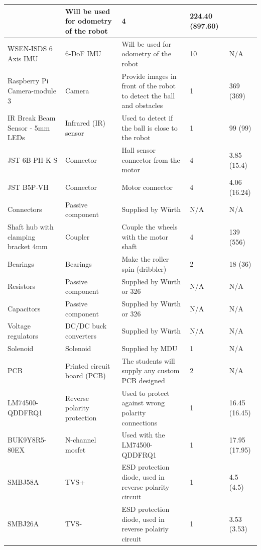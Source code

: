 \documentclass[a4paper,4pt]{article}
\begin{document}
\begin{center}
\begin{longtable}{|p{3cm}|p{3cm}|p{3cm}|p{1cm}|p{2cm}| }
      & Will be used for odometry of the robot & 4 & 224.40 (897.60) \\
      \hline WSEN-ISDS 6 Axis IMU & 6-DoF IMU & Will be used for
      odometry of the robot & 10 & N/A\\ \hline Raspberry Pi
      Camera-module 3 & Camera & Provide images in front of the robot to
      detect the ball and obstacles & 1 & 369 (369) \\ \hline IR Break
      Beam Sensor - 5mm LEDs & Infrared (IR) sensor & Used to detect if
      the ball is close to the robot & 1 & 99 (99) \\ \hline JST
      6B-PH-K-S & Connector & Hall sensor connector from the motor & 4 &
      3.85 (15.4) \\ \hline JST B5P-VH & Connector & Motor connector & 4
      & 4.06 (16.24) \\ \hline Connectors & Passive component & Supplied
      by Würth & N/A & N/A \\ \hline Shaft hub with clamping bracket 4mm
      & Coupler & Couple the wheels with the motor shaft & 4 & 139 (556)
      \\ \hline Bearings & Bearings & Make the roller spin (dribbler) &
      2 & 18 (36)\\ \hline Resistors & Passive component & Supplied by
      Würth or 326 & N/A & N/A \\ \hline Capacitors & Passive component
      & Supplied by Würth or 326 & N/A & N/A \\ \hline Voltage
      regulators & DC/DC buck converters & Supplied by Würth & N/A & N/A
      \\ \hline Solenoid & Solenoid & Supplied by MDU & 1 & N/A \\
      \hline PCB & Printed circuit board (PCB) & The students will
      supply any custom PCB designed & 2 & N/A\\ \hline
      LM74500\break-QDDFRQ1 & Reverse polarity protection & Used to
      protect against wrong polarity connections & 1 & 16.45 (16.45) \\
      \hline BUK9Y8R5-80EX & N-channel mosfet & Used with the
      LM74500\break-QDDFRQ1 & 1 & 17.95 (17.95) \\ \hline SMBJ58A & TVS+
      & ESD protection diode, used in reverse polarity circuit & 1 & 4.5
      (4.5) \\ \hline SMBJ26A & TVS- & ESD protection diode, used in
      reverse polairiy circuit & 1 & 3.53 (3.53) \\ \hline

    \end{longtable}
  \end{center}
\end{document}
